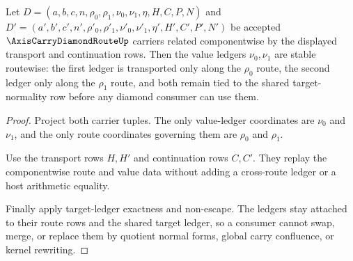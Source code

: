 \begin{theorem}
\label{thm:axis-carry-diamond-route-value-ledger-stability}
Let $D=(a,b,c,n,\rho_0,\rho_1,\nu_0,\nu_1,\eta,H,C,P,N)$ and $D'=(a',b',c',n',\rho'_0,\rho'_1,\nu'_0,\nu'_1,\eta',H',C',P',N')$ be accepted $\AxisCarryDiamondRouteUp$ carriers related componentwise by the displayed transport and continuation rows. Then the value ledgers $\nu_0,\nu_1$ are stable routewise: the first ledger is transported only along the $\rho_0$ route, the second ledger only along the $\rho_1$ route, and both remain tied to the shared target-normality row before any diamond consumer can use them.
\end{theorem}
\begin{proof}
Project both carrier tuples. The only value-ledger coordinates are $\nu_0$ and $\nu_1$, and the only route coordinates governing them are $\rho_0$ and $\rho_1$.

Use the transport rows $H,H'$ and continuation rows $C,C'$. They replay the componentwise route and value data without adding a cross-route ledger or a host arithmetic equality.

Finally apply target-ledger exactness and non-escape. The ledgers stay attached to their route rows and the shared target ledger, so a consumer cannot swap, merge, or replace them by quotient normal forms, global carry confluence, or kernel rewriting.
\end{proof}

